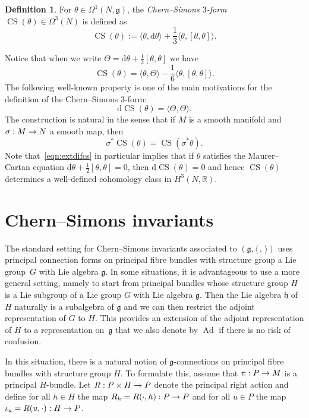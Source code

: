 \documentclass[10pt,a4paper]{amsart}
\renewcommand{\th}{\theta}
\newcommand{\Om}{\Omega}
\newcommand{\B}[2]{\langle#1,#2\rangle}
\DeclareMathOperator{\CS}{CS}
\DeclareMathOperator{\Ad}{Ad}
\renewcommand*{\d}{\mathrm{d}}
\newcommand*{\R}{\mathbb{R}}
\newcommand{\fkg}{\mathfrak{g}}
\newcommand{\fkh}{\mathfrak{h}}
\renewcommand*{\to}{\mathchoice{\longrightarrow}{\rightarrow}{\rightarrow}{\rightarrow}}
\theoremstyle{definition}\newtheorem{defi}[theo]{Definition}
\begin{document}
\begin{defi}\label{def:CS}
For $\theta\in\Om^1(N,\fkg)$, the \emph{Chern--Simons $3$-form} $\CS(\th)\in\Om^3(N)$ is defined as
\[
\CS(\th):=\B{\th}{\d\th}+\frac13 \B{\th}{[\th,\th]}.
\]
\end{defi}

Notice that when we write $\Theta=\d\theta+\frac{1}{2}[\theta,\theta]$ we have
\[
\CS(\theta)=\B{\theta}{\Theta}-\frac{1}{6}\B{\theta}{[\theta,\theta]}.
\]
The following well-known property is one of the main motivations for the definition of the Chern--Simons $3$-form:
\begin{equation}\label{eqn:extdifcs}
\d\CS(\th)=\B{\Theta}{\Theta}.
\end{equation}
The construction is natural in the sense that if $M$ is a smooth manifold and\linebreak $\sigma : M \to N$ a smooth map, then
\begin{equation}\label{eqn:cspullback}
\sigma^*\CS(\theta)=\CS(\sigma^*\theta).
\end{equation}
Note that~\eqref{eqn:extdifcs} in particular implies that if $\th$ satisfies the Maurer--Cartan equation $\d\th+\frac12[\th,\th]=0$, then $\d\CS(\th)=0$ and hence $\CS(\th)$ determines a well-defined cohomology class in $H^3(N,\R)$.

\section{Chern--Simons invariants}\label{1.3}

The standard setting for Chern--Simons invariants associated to $(\fkg,\B{\,}{\,})$ uses principal connection forms on principal fibre bundles with structure group a Lie group~$G$ with Lie algebra $\fkg$. In some situations, it is advantageous to use a more general setting, namely to start from principal bundles whose structure group $H$ is a Lie subgroup of a Lie group $G$ with Lie algebra $\fkg$. Then the Lie algebra $\fkh$ of $H$ naturally is a subalgebra of $\fkg$ and we can then restrict the adjoint representation of $G$ to $H$. This provides an extension of the adjoint representation of $H$ to a representation on~$\fkg$ that we also denote by $\Ad$ if there is no risk of confusion.

In this situation, there is a natural notion of $\fkg$-connections on principal fibre bundles with structure group $H$. To formulate this, assume that $\pi: P\to M$ is a principal $H$-bundle. Let $R : P \times H \to P$ denote the principal right action and define for all $h \in H$ the map $R_h=R(\cdot,h) : P
\to P$ and for all $u \in P$ the map $\iota_u=R(u,\cdot) : H \to P$.
\end{document}
